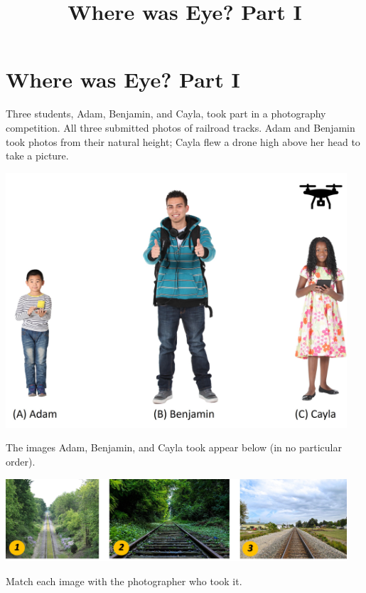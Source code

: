 \documentclass{ximera}
\title{Where was Eye? Part I} \license{CC BY-NC-SA 4.0}
\begin{document}
\begin{abstract}
\end{abstract}
\maketitle

\section*{Where was Eye? Part I}

\begin{exploration}\label{exp:matchPic}
Three students, Adam, Benjamin, and Cayla, took part in a photography competition.  All three submitted photos of railroad tracks.  Adam and Benjamin took photos from their natural height; Cayla flew a drone high above her head to take a picture.
    \begin{image}
         \includegraphics[width=5in]{AdamBenjaminCayla.jpg}
\end{image}
The images Adam, Benjamin, and Cayla took appear below (in no particular order).
\begin{image}
         \includegraphics[width=5in]{threePics.jpg}
\end{image}
Match each image with the photographer who took it.


\end{exploration}
\end{document}
